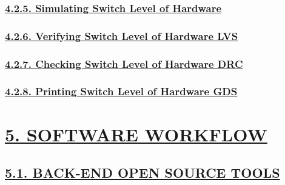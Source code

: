\documentclass[
]{article}
\begin{document}
\hypertarget{simulating-switch-level-of-hardware}{%
\subsubsection{\texorpdfstring{\protect\hyperlink{simulating-switch-level-of-hardware-1}{4.2.5.
Simulating Switch Level of
Hardware}}{4.2.5. Simulating Switch Level of Hardware}}\label{simulating-switch-level-of-hardware}}

\hypertarget{verifying-switch-level-of-hardware-lvs}{%
\subsubsection{\texorpdfstring{\protect\hyperlink{verifying-switch-level-of-hardware-lvs-1}{4.2.6.
Verifying Switch Level of Hardware
LVS}}{4.2.6. Verifying Switch Level of Hardware LVS}}\label{verifying-switch-level-of-hardware-lvs}}

\hypertarget{checking-switch-level-of-hardware-drc}{%
\subsubsection{\texorpdfstring{\protect\hyperlink{checking-switch-level-of-hardware-drc-1}{4.2.7.
Checking Switch Level of Hardware
DRC}}{4.2.7. Checking Switch Level of Hardware DRC}}\label{checking-switch-level-of-hardware-drc}}

\hypertarget{printing-switch-level-of-hardware-gds}{%
\subsubsection{\texorpdfstring{\protect\hyperlink{printing-switch-level-of-hardware-gds-1}{4.2.8.
Printing Switch Level of Hardware
GDS}}{4.2.8. Printing Switch Level of Hardware GDS}}\label{printing-switch-level-of-hardware-gds}}

\hypertarget{software-workflow}{%
\section{\texorpdfstring{\protect\hyperlink{software-workflow-1}{5.
SOFTWARE WORKFLOW}}{5. SOFTWARE WORKFLOW}}\label{software-workflow}}

\hypertarget{back-end-open-source-tools-1}{%
\subsection{\texorpdfstring{\protect\hyperlink{back-end-open-source-tools-3}{5.1.
BACK-END OPEN SOURCE
TOOLS}}{5.1. BACK-END OPEN SOURCE TOOLS}}\label{back-end-open-source-tools-1}}
\end{document}
